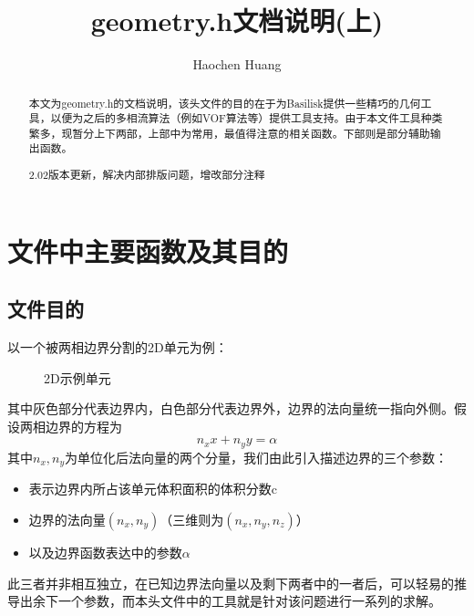 \documentclass[lang=cn,11pt,a4paper]{elegantpaper}
\title{geometry.h文档说明(上)}
\author{Haochen Huang}
\institute{西安交通大学MFM课题组}
\date{\zhtoday}
\begin{document}
\maketitle
\tableofcontents

\begin{abstract}
本文为geometry.h的文档说明，该头文件的目的在于为Basilisk提供一些精巧的几何工具，以便为之后的多相流算法（例如VOF算法等）提供工具支持。由于本文件工具种类繁多，现暂分上下两部，上部中为常用，最值得注意的相关函数。下部则是部分辅助输出函数。\par
2.02版本更新，解决内部排版问题，增改部分注释
\end{abstract}

\section{文件中主要函数及其目的}
\subsection{文件目的}
以一个被两相边界分割的2D单元为例：\par
\begin{figure}[H]
\begin{center}
\end{center}
\caption{2D示例单元}
\end{figure}
其中灰色部分代表边界内，白色部分代表边界外，边界的法向量统一指向外侧。假设两相边界的方程为
\begin{equation}
    n_xx+n_yy=\alpha
\end{equation}
其中$n_x,n_y$为单位化后法向量的两个分量，我们由此引入描述边界的三个参数：
\begin{itemize}
    \item 表示边界内所占该单元体积面积的体积分数c
    \item 边界的法向量$(n_x,n_y)$（三维则为$(n_x,n_y,n_z)$）
    \item 以及边界函数表达中的参数$\alpha$
\end{itemize}
此三者并非相互独立，在已知边界法向量以及剩下两者中的一者后，可以轻易的推导出余下一个参数，而本头文件中的工具就是针对该问题进行一系列的求解。\par
\end{document}
